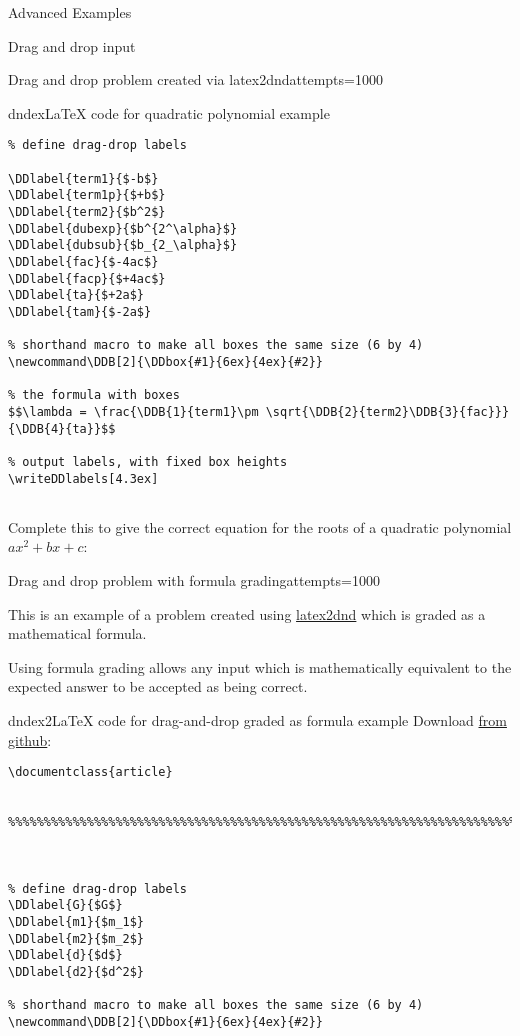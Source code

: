 \begin{edXchapter}{Advanced Examples}
\begin{edXsection}{Drag and drop input}
\begin{edXvertical}
\begin{edXproblem}{Drag and drop problem created via latex2dnd}{attempts=1000}
\begin{edXshowhide}{dndex}{LaTeX code for quadratic polynomial example}
\begin{verbatim}
% define drag-drop labels

\DDlabel{term1}{$-b$}
\DDlabel{term1p}{$+b$}
\DDlabel{term2}{$b^2$}
\DDlabel{dubexp}{$b^{2^\alpha}$}
\DDlabel{dubsub}{$b_{2_\alpha}$}
\DDlabel{fac}{$-4ac$}
\DDlabel{facp}{$+4ac$}
\DDlabel{ta}{$+2a$}
\DDlabel{tam}{$-2a$}

% shorthand macro to make all boxes the same size (6 by 4)
\newcommand\DDB[2]{\DDbox{#1}{6ex}{4ex}{#2}}

% the formula with boxes
$$\lambda = \frac{\DDB{1}{term1}\pm \sqrt{\DDB{2}{term2}\DDB{3}{fac}}}{\DDB{4}{ta}}$$

% output labels, with fixed box heights
\writeDDlabels[4.3ex]


\end{verbatim}
\end{edXshowhide}

Complete this to give the correct equation for the roots of a
quadratic polynomial $ax^2 + bx + c$:


\end{edXproblem}


\begin{edXproblem}{Drag and drop problem with formula grading}{attempts=1000}

This is an example of a problem created using
\href{https://github.com/mitocw/latex2dnd}{latex2dnd} which is graded
as a mathematical formula.

Using formula grading allows any input which is mathematically
equivalent to the expected answer to be accepted as being correct.

\begin{edXshowhide}{dndex2}{LaTeX code for drag-and-drop graded as formula example}
Download \href{https://github.com/mitocw/latex2dnd/blob/master/latex2dnd/testtex/quadratic.tex}{from github}:
\begin{verbatim}
\documentclass{article}


%%%%%%%%%%%%%%%%%%%%%%%%%%%%%%%%%%%%%%%%%%%%%%%%%%%%%%%%%%%%%%%%%%%%%%%%%%%%%



% define drag-drop labels
\DDlabel{G}{$G$}
\DDlabel{m1}{$m_1$}
\DDlabel{m2}{$m_2$}
\DDlabel{d}{$d$}
\DDlabel{d2}{$d^2$}

% shorthand macro to make all boxes the same size (6 by 4)
\newcommand\DDB[2]{\DDbox{#1}{6ex}{4ex}{#2}}


\end{verbatim}
\end{edXshowhide}
\end{edXproblem}
\end{edXvertical}
\end{edXsection}
\end{edXchapter}
